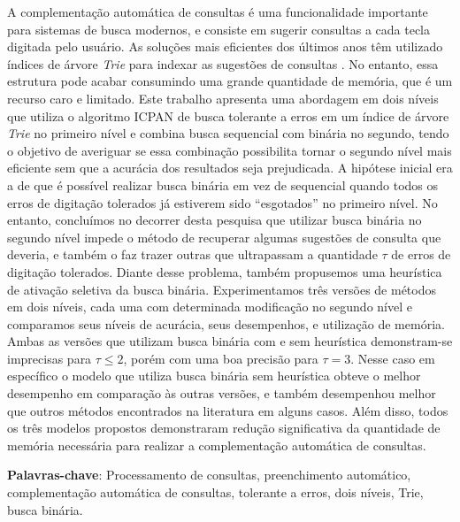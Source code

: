 \documentclass[
	12pt,				%
	openright,			%
	twoside,			%
	a4paper,			%
	english,			%
	spanish,			%
	brazil,				%
	]{abntex2}
\begin{document}
\begin{resumo}
A complementação automática de consultas é uma funcionalidade importante para sistemas de busca modernos, e consiste em sugerir consultas a cada tecla digitada pelo usuário. As soluções mais eficientes dos últimos anos têm utilizado índices de árvore \textit{Trie} para indexar as sugestões de consultas \citep{ji2009efficient, li2011efficient, xiao2013efficient, deng2016meta, zhou2016beva}. No entanto, essa estrutura pode acabar consumindo uma grande quantidade de memória, que é um recurso caro e limitado. Este trabalho apresenta uma abordagem em dois níveis que utiliza o algoritmo ICPAN \citep{li2011efficient} de busca tolerante a erros em um índice de árvore \textit{Trie} no primeiro nível e combina busca sequencial com binária no segundo, tendo o objetivo de averiguar se essa combinação possibilita tornar o segundo nível mais eficiente sem que a acurácia dos resultados seja prejudicada. A hipótese inicial era a de que é possível realizar busca binária em vez de sequencial quando todos os erros de digitação tolerados já estiverem sido ``esgotados'' no primeiro nível. No entanto, concluímos no decorrer desta pesquisa que utilizar busca binária no segundo nível impede o método de recuperar algumas sugestões de consulta que deveria, e também o faz trazer outras que ultrapassam a quantidade $\tau$ de erros de digitação tolerados. Diante desse problema, também propusemos uma heurística de ativação seletiva da busca binária. Experimentamos três versões de métodos em dois níveis, cada uma com determinada modificação no segundo nível e comparamos seus níveis de acurácia, seus desempenhos, e utilização de memória. Ambas as versões que utilizam busca binária com e sem heurística demonstram-se imprecisas para $\tau \leq 2$, porém com uma boa precisão para $\tau=3$. Nesse caso em específico o modelo que utiliza busca binária sem heurística obteve o melhor desempenho em comparação às outras versões, e também desempenhou melhor que outros métodos encontrados na literatura em alguns casos. Além disso, todos os três modelos propostos demonstraram redução significativa da quantidade de memória necessária para realizar a complementação automática de consultas.

\vspace{\onelineskip}
\noindent
\textbf{Palavras-chave}: Processamento de consultas, preenchimento automático, complementação automática de consultas, tolerante a erros, dois níveis, Trie, busca binária.
 

\end{resumo}
\end{document}
